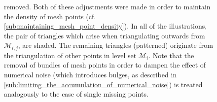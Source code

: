 \begin{figure}[htpb]
{        removed. Both of these adjustments were made in order to maintain the
        density of mesh points (cf.\ %
        \cref{sub:maintaining_mesh_point_density}). In all of the
        illustrations, the pair of triangles which arise when triangulating
        outwards from $\mathcal{M}_{i,j}$, are shaded. The remaining triangles
        (patterned) originate from the triangulation of other points in level
        set $\mathcal{M}_{i}$. Note that the removal of bundles of mesh points
        in order to dampen the effect of numerical noise (which introduces
        bulges, as described in
        \cref{sub:limiting_the_accumulation_of_numerical_noise}) is treated
        analogously to the case of single missing points.
    }
    \label{fig:triangulation_specialcases}
\end{figure}
